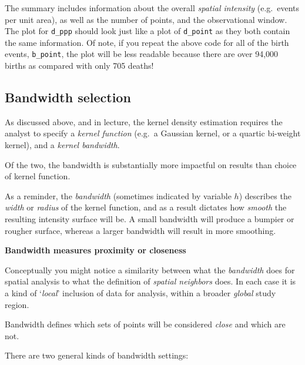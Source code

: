 \documentclass[
]{book}
\newenvironment{rmdnote}[1]
  {
  \begin{itemize}
  \renewcommand{\labelitemi}{
    \raisebox{-.7\height}[0pt][0pt]{
      {\setkeys{Gin}{width=3em,keepaspectratio}\texttt{[image: images/\#1]}}
    }
  }
  \setlength{\fboxsep}{1em}
  \begin{note}
  \item
  }
  {
  \end{note}
  \end{itemize}
  }
\begin{document}
The summary includes information about the overall \emph{spatial intensity} (e.g.~events per unit area), as well as the number of points, and the observational window. The plot for \texttt{d\_ppp} should look just like a plot of \texttt{d\_point} as they both contain the same information. Of note, if you repeat the above code for all of the birth events, \texttt{b\_point}, the plot will be less readable because there are over 94,000 births as compared with only 705 deaths!

\hypertarget{bandwidth-selection}{%
\subsection{Bandwidth selection}\label{bandwidth-selection}}

As discussed above, and in lecture, the kernel density estimation requires the analyst to specify a \emph{kernel function} (e.g.~a Gaussian kernel, or a quartic bi-weight kernel), and a \emph{kernel bandwidth}.

Of the two, the bandwidth is substantially more impactful on results than choice of kernel function.

As a reminder, the \emph{bandwidth} (sometimes indicated by variable \(h\)) describes the \emph{width} or \emph{radius} of the kernel function, and as a result dictates how \emph{smooth} the resulting intensity surface will be. A small bandwidth will produce a bumpier or rougher surface, whereas a larger bandwidth will result in more smoothing.

\begin{rmdnote}{note}
\textbf{Bandwidth measures proximity or closeness}

Conceptually you might notice a similarity between what the \emph{bandwidth} does for spatial analysis to what the definition of \emph{spatial neighbors} does. In each case it is a kind of `\emph{local}' inclusion of data for analysis, within a broader \emph{global} study region.

Bandwidth defines which sets of points will be considered \emph{close} and which are not.

\end{rmdnote}

There are two general kinds of bandwidth settings:
\end{document}
